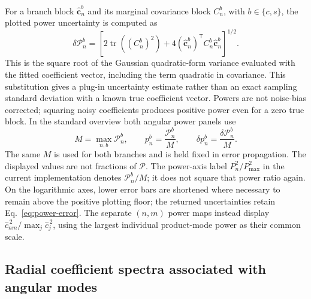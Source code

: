 \documentclass[aps,prb,preprint,onecolumn,notitlepage,amsmath,amssymb,
  superscriptaddress,floatfix]{revtex4-2}
\newcommand{\trans}{\mathsf{T}}
\newcommand{\tr}{\operatorname{tr}}
\begin{document}
For a branch block $\widehat{\bm c}_n^b$ and its marginal covariance block
$C_n^b$, with $b\in\{c,s\}$, the plotted power uncertainty is computed as
\begin{equation}
 \delta\mathcal{P}_n^b=
 \left[2\tr\!\left((C_n^b)^2\right)
 +4(\widehat{\bm c}_n^b)^{\trans}C_n^b\widehat{\bm c}_n^b\right]^{1/2}.
 \label{eq:power-error}
\end{equation}
This is the square root of the Gaussian quadratic-form variance evaluated
with the fitted coefficient vector, including the term quadratic in
covariance. This substitution gives a plug-in uncertainty estimate rather
than an exact sampling standard deviation with a known true coefficient
vector. Powers are
not noise-bias corrected; squaring noisy coefficients produces positive
power even for a zero true block. In the standard overview both angular
power panels use
\begin{equation*}
 M=\max_{n,b}\mathcal{P}_n^b,\qquad
 p_n^b=\frac{\mathcal{P}_n^b}{M},\qquad
 \delta p_n^b=\frac{\delta\mathcal{P}_n^b}{M}.
\end{equation*}
The same $M$ is used for both branches and is held fixed in error
propagation. The displayed values are not fractions of $\mathcal{P}$.
The power-axis label $P_n^2/P_{\max}^2$ in the current implementation
denotes $\mathcal{P}_n^b/M$; it does not square that power ratio again.
On the logarithmic axes, lower error bars are shortened where necessary
to remain above the positive plotting floor; the returned uncertainties
retain Eq.~\eqref{eq:power-error}. The separate $(n,m)$ power maps instead
display $\widehat c_{nm}^{\,2}/\max_j\widehat c_j^{\,2}$, using the largest
individual product-mode power as their common scale.

\subsection{Radial coefficient spectra associated with angular modes}
\end{document}
